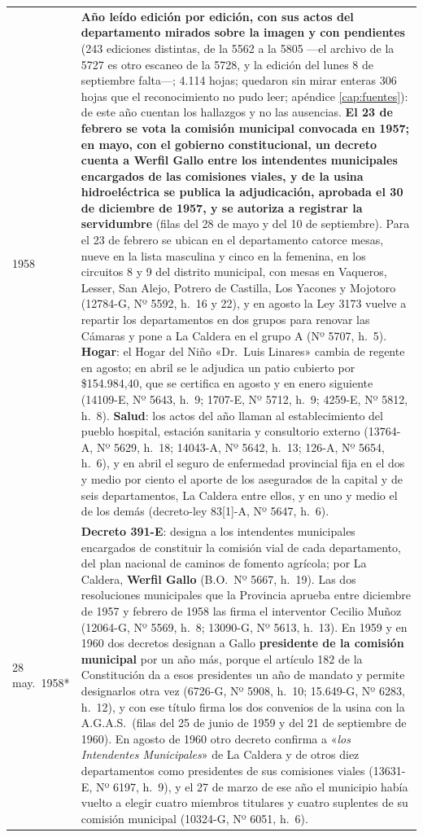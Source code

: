 \begin{longtable}{@{}p{2.7cm}p{10.3cm}@{}}
1958 & \textbf{Año leído edición por edición, con sus actos del departamento mirados sobre la imagen y con pendientes} (243 ediciones distintas, de la 5562 a la 5805 ---el archivo de la 5727 es otro escaneo de la 5728, y la edición del lunes 8 de septiembre falta---; 4.114 hojas; quedaron sin mirar enteras 306 hojas que el reconocimiento no pudo leer; apéndice \ref{cap:fuentes}): de este año cuentan los hallazgos y no las ausencias. \textbf{El 23 de febrero se vota la comisión municipal convocada en 1957; en mayo, con el gobierno constitucional, un decreto cuenta a Werfil Gallo entre los intendentes municipales encargados de las comisiones viales, y de la usina hidroeléctrica se publica la adjudicación, aprobada el 30 de diciembre de 1957, y se autoriza a registrar la servidumbre} (filas del 28 de mayo y del 10 de septiembre). Para el 23 de febrero se ubican en el departamento catorce mesas, nueve en la lista masculina y cinco en la femenina, en los circuitos 8 y 9 del distrito municipal, con mesas en Vaqueros, Lesser, San Alejo, Potrero de Castilla, Los Yacones y Mojotoro (12784-G, Nº 5592, h.\ 16 y 22), y en agosto la Ley 3173 vuelve a repartir los departamentos en dos grupos para renovar las Cámaras y pone a La Caldera en el grupo A (Nº 5707, h.\ 5). \textbf{Hogar}: el Hogar del Niño «Dr.\ Luis Linares» cambia de regente en agosto; en abril se le adjudica un patio cubierto por \$154.984,40, que se certifica en agosto y en enero siguiente (14109-E, Nº 5643, h.\ 9; 1707-E, Nº 5712, h.\ 9; 4259-E, Nº 5812, h.\ 8). \textbf{Salud}: los actos del año llaman al establecimiento del pueblo hospital, estación sanitaria y consultorio externo (13764-A, Nº 5629, h.\ 18; 14043-A, Nº 5642, h.\ 13; 126-A, Nº 5654, h.\ 6), y en abril el seguro de enfermedad provincial fija en el dos y medio por ciento el aporte de los asegurados de la capital y de seis departamentos, La Caldera entre ellos, y en uno y medio el de los demás (decreto-ley 83[1]-A, Nº 5647, h.\ 6). \\
28 may.\ 1958* & \textbf{Decreto 391-E}: designa a los intendentes municipales encargados de constituir la comisión vial de cada departamento, del plan nacional de caminos de fomento agrícola; por La Caldera, \textbf{Werfil Gallo} (B.O.\ Nº 5667, h.\ 19). Las dos resoluciones municipales que la Provincia aprueba entre diciembre de 1957 y febrero de 1958 las firma el interventor Cecilio Muñoz (12064-G, Nº 5569, h.\ 8; 13090-G, Nº 5613, h.\ 13). En 1959 y en 1960 dos decretos designan a Gallo \textbf{presidente de la comisión municipal} por un año más, porque el artículo 182 de la Constitución da a esos presidentes un año de mandato y permite designarlos otra vez (6726-G, Nº 5908, h.\ 10; 15.649-G, Nº 6283, h.\ 12), y con ese título firma los dos convenios de la usina con la A.G.A.S.\ (filas del 25 de junio de 1959 y del 21 de septiembre de 1960). En agosto de 1960 otro decreto confirma a «\textit{los Intendentes Municipales}» de La Caldera y de otros diez departamentos como presidentes de sus comisiones viales (13631-E, Nº 6197, h.\ 9), y el 27 de marzo de ese año el municipio había vuelto a elegir cuatro miembros titulares y cuatro suplentes de su comisión municipal (10324-G, Nº 6051, h.\ 6). \\

\end{longtable}
